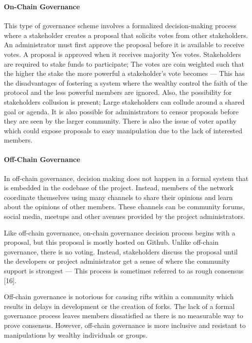 \noindent
\textbf{On-Chain Governance}\\\\
This type of governance scheme involves a formalized decision-making process where a stakeholder creates a proposal that solicits votes from other stakeholders. An administrator must first approve the proposal before it is available to receive votes. A proposal is approved when it receives majority Yes votes. Stakeholders are required to stake funds to participate; The votes are coin weighted such that the higher the stake the more powerful a stakeholder’s vote becomes — This has the disadvantages of fostering a system where the wealthy control the faith of the protocol and the less powerful members are ignored. Also, the possibility for stakeholders collusion is present; Large stakeholders can collude around a shared goal or agenda. It is also possible for administrators to censor proposals before they are seen by the larger community. There is also the issue of voter apathy which could expose proposals to easy manipulation due to the lack of interested members.\\\\


\noindent
\textbf{Off-Chain Governance}\\\\
In off-chain governance, decision making does not happen in a formal system that is embedded in the codebase of the project. Instead, members of the network coordinate themselves using many channels to share their opinions and learn about the opinions of other members. These channels can be community forums, social media, meetups and other avenues provided by the project administrators.

Like off-chain governance, on-chain governance decision process begins with a proposal, but this proposal is mostly hosted on Github. Unlike off-chain governance, there is no voting. Instead, stakeholders discuss the proposal until the developers or project administrator get a sense of where the community support is strongest — This process is sometimes referred to as rough consensus [16].

Off-chain governance is notorious for causing rifts within a community which results in delays in development or the creation of forks. The lack of a formal governance process leaves members dissatisfied as there is no measurable way to prove consensus. However, off-chain governance is more inclusive and resistant to manipulations by wealthy individuals or groups.\\\\

